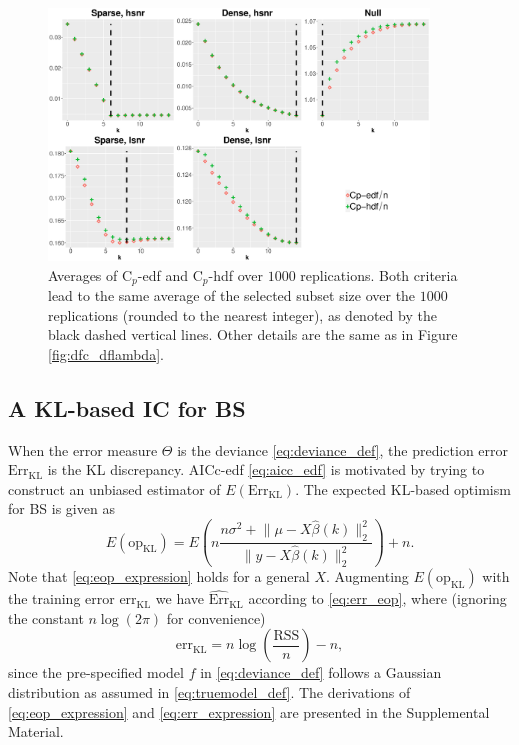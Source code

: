 \begin{figure}[!ht]
	\centering
	\includegraphics[width=0.9\textwidth]{figures/cp_edf_hdf_bs.eps}
	\caption{Averages of C$_p$-edf and C$_p$-hdf over $1000$ replications. Both criteria lead to the same average of the selected subset size over the $1000$ replications (rounded to the nearest integer), as denoted by the black dashed vertical lines. Other details are the same as in Figure \ref{fig:dfc_dflambda}.}
	\label{fig:cp_edf_hdf} 
\end{figure}


\subsection{A KL-based IC for BS}
When the error measure $\Theta$ is the deviance \eqref{eq:deviance_def}, the prediction error $\text{Err}_\text{KL}$ is the KL discrepancy. AICc-edf \eqref{eq:aicc_edf} is motivated by trying to construct an unbiased estimator of $E(\text{Err}_\text{KL})$. The expected KL-based optimism for BS is given as
\begin{equation}
E(\text{op}_\text{KL}) = E\left(n \frac{n\sigma^2+\lVert \mu-X\hat{\beta}(k) \rVert_2^2}{\lVert y-X\hat{\beta}(k)\rVert_2^2}\right) + n.
\label{eq:eop_expression}
\end{equation}
Note that \eqref{eq:eop_expression} holds for a general $X$. Augmenting $E(\text{op}_\text{KL})$ with the training error $\text{err}_{\text{KL}}$ we have $\widehat{\text{Err}}_{\text{KL}}$ according to \eqref{eq:err_eop}, where (ignoring the constant $n\log(2\pi)$ for convenience)
\begin{equation}
\text{err}_{\text{KL}} = n\log\left(\frac{\text{RSS}}{n}\right) - n,
\label{eq:err_expression}
\end{equation}
since the pre-specified model $f$ in \eqref{eq:deviance_def} follows a Gaussian distribution as assumed in \eqref{eq:truemodel_def}. The derivations of \eqref{eq:eop_expression} and \eqref{eq:err_expression} are presented in the Supplemental Material. 

